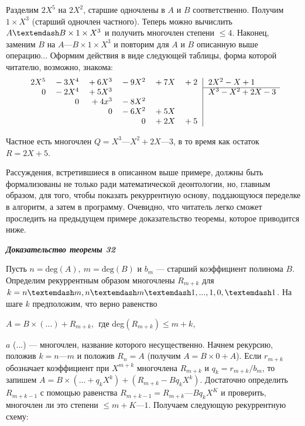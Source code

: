 \documentclass{mai_book}
\begin{document}
Разделим $2X^5$ на $2X^2$, старшие одночлены в $A$ и $B$ соответственно. 
Получим $1 \times X^3$ (старший одночлен частного). Теперь можно вычислить 
$A — B \times 1 \times\newline X^3$ и получить многочлен степени $\leq 4$. Наконец, заменим $B$ 
на $A — B \times 1 \times X^3$ и повторим для $A$ и $B$ описанную выше операцию... 
Оформим действия в виде следующей таблицы, форма которой  
читателю, возможно, знакома: 
$$
\begin{array}{rrrrrr@{\,}r|l}
2X^5&{}-3X^4&{}+6X^3&{}-9X^2&{}+7X&{}+2&&\,2X^2-X+1\\
\cline{8-8}
0&{}-2X^4&{}+5X^3&&&&&\,X^3-X^2+2X-3\\
&{}0&{}+4x^3&{}-8X^2&&&&\\
&{}&{}0&{}-6X^2&{}+5X&{}&&\\
&{}&{}&{}0&{}+2X&{}+5&{}&\\
\end{array}
$$

Частное есть многочлен $Q = X^3 — X^2 + 2X — 3$, в то время как 
остаток $R = 2X + 5$. 

Рассуждения, встретившиеся в описанном выше примере, должны 
быть формализованы не только ради математической деонтологии, но, 
главным образом, для того, чтобы показать рекуррентную основу,  
поддающуюся переделке в алгоритм, а затем в программу. Очевидно, что 
читатель легко сможет проследить на предыдущем примере  
доказательство теоремы, которое приводится ниже. 

\noindent\textbf{\textit{Доказательство теоремы 32}}

Пусть $n = \text{deg}(A),\: m = \text{deg}(B)$ и $b_m$ — старший коэффициент  
полинома $B$. Определим рекуррентным образом многочлены $R_{m+k}$ для 
$k = n — m, n — m — 1,\newline ..., 1,0, —1$. На шаге $k$ предположим, что верно 
равенство

\begin{center}
$A = B \times (...) + R_{m+k},\:\:$где deg$(R_{m+k}) \leqslant m + k$,
\end{center} 
\pagebreak

\noindent$a$ (...) — многочлен, название которого несущественно. Начнем  
рекурсию, положив $k = n — m$ и положив $R_n = A$ (получим $A = B \times 0 + A$). 
Если $r_{m+k}$ обозначает коэффициент при $X^{m+k}$ многочлена $R_{m+k}$ и 
$q_k = r_{m+k}\slash b_m$, то запишем $A = B\times (... + q_kX^k) + (R_{m+k} - Bq_kX^k)$.  
Достаточно определить $R_{m+k-1}$ с помощью равенства $R_{m+k-1} = R_{m+k} — 
Bq_kX^K$ и проверить, многочлен ли это степени $\leqslant m + K — 1$. Получаем 
следующую рекуррентную схему:
\end{document}
